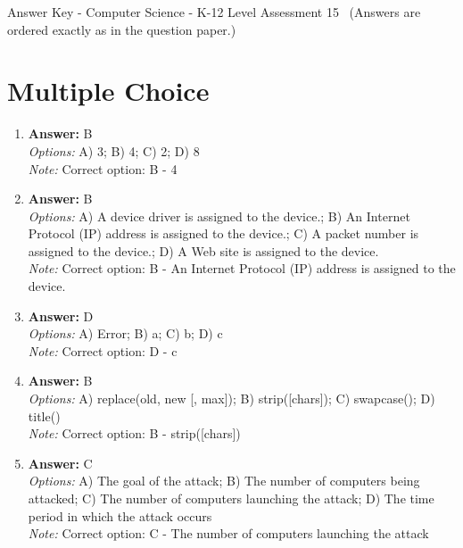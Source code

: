 \documentclass[12pt]{article}
\begin{document}
\begin{center}
Answer Key - Computer Science - K-12 Level Assessment 15 \
\small (Answers are ordered exactly as in the question paper.)
\end{center}

\section*{Multiple Choice}
\begin{enumerate}[label=\arabic*.]
\item \textbf{Answer:} B
\\ \textit{Options:} A) 3; B) 4; C) 2; D) 8
\\ \textit{Note:} Correct option: B - 4
\item \textbf{Answer:} B
\\ \textit{Options:} A) A device driver is assigned to the device.; B) An Internet Protocol (IP) address is assigned to the device.; C) A packet number is assigned to the device.; D) A Web site is assigned to the device.
\\ \textit{Note:} Correct option: B - An Internet Protocol (IP) address is assigned to the device.
\item \textbf{Answer:} D
\\ \textit{Options:} A) Error; B) a; C) b; D) c
\\ \textit{Note:} Correct option: D - c
\item \textbf{Answer:} B
\\ \textit{Options:} A) replace(old, new [, max]); B) strip([chars]); C) swapcase(); D) title()
\\ \textit{Note:} Correct option: B - strip([chars])
\item \textbf{Answer:} C
\\ \textit{Options:} A) The goal of the attack; B) The number of computers being attacked; C) The number of computers launching the attack; D) The time period in which the attack occurs
\\ \textit{Note:} Correct option: C - The number of computers launching the attack
\end{enumerate}
\end{document}
